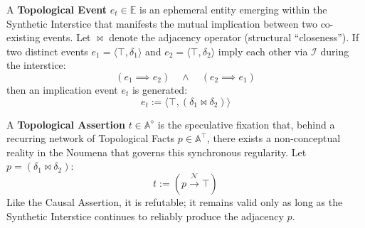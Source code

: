 

\begin{formalism}
    A \textbf{Topological Event} $e_t \in \mathbb{E}$ is an ephemeral entity
    emerging within the Synthetic Interstice that manifests the mutual
    implication between two co-existing events. Let $\bowtie$ denote the
    adjacency operator (structural ``closeness''). If two distinct events
    $e_1 = \langle \top, \delta_1 \rangle$ and $e_2 = \langle \top, \delta_2
    \rangle$ imply each other via $\mathcal{I}$ during the interstice:
    \begin{equation}
        (e_1 \implies e_2) \quad \land \quad (e_2 \implies e_1)
    \end{equation}
    then an implication event $e_t$ is generated:
    \begin{equation}
        e_t := \langle \top, (\delta_1 \bowtie \delta_2) \rangle
    \end{equation}
\end{formalism}

\begin{formalism}
    A \textbf{Topological Assertion} $t \in \mathbb{A}^\diamond$ is the
    speculative fixation that, behind a recurring network of Topological
    Facts $p \in \mathbb{A}^\top$, there exists a non-conceptual reality in
    the Noumena that governs this synchronous regularity. Let $p = (\delta_1
    \bowtie \delta_2)$:
    \begin{equation}
        t := (p \xrightarrow{\mathcal{N}} \top)
    \end{equation}
    Like the Causal Assertion, it is refutable; it remains valid only as
    long as the Synthetic Interstice continues to reliably produce the
    adjacency $p$.
\end{formalism}


